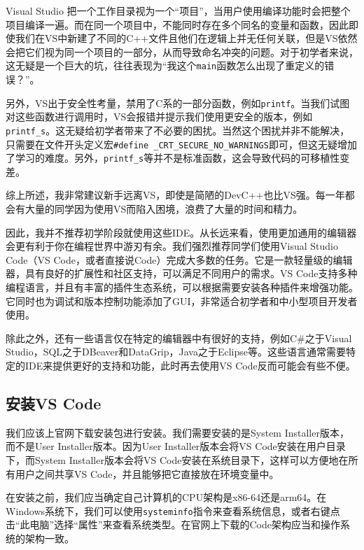 \documentclass[../main.tex]{subfiles}
\begin{document}
\begin{note}
  Visual Studio 把一个工作目录视为一个“项目”，当用户使用编译功能时会把整个项目编译一遍。而在同一个项目中，不能同时存在多个同名的变量和函数，因此即使我们在VS中新建了不同的C++文件且他们在逻辑上并无任何关联，但是VS依然会把它们视为同一个项目的一部分，从而导致命名冲突的问题。对于初学者来说，这无疑是一个巨大的坑，往往表现为“我这个\texttt{main}函数怎么出现了重定义的错误？”。

  另外，VS出于安全性考量，禁用了C系的一部分函数，例如\texttt{printf}。当我们试图对这些函数进行调用时，VS会报错并提示我们使用更安全的版本，例如\texttt{printf\_s}。这无疑给初学者带来了不必要的困扰。当然这个困扰并非不能解决，只需要在文件开头定义宏\texttt{\#define \_CRT\_SECURE\_NO\_WARNINGS}即可，但这无疑增加了学习的难度。另外，\texttt{printf\_s}等并不是标准函数，这会导致代码的可移植性变差。

  综上所述，我非常建议新手远离VS，即使是简陋的DevC++也比VS强。每一年都会有大量的同学因为使用VS而陷入困境，浪费了大量的时间和精力。
\end{note}

因此，我并不推荐初学阶段就使用这些IDE。从长远来看，使用更加通用的编辑器会更有利于你在编程世界中游刃有余。我们强烈推荐同学们使用Visual Studio Code（VS Code，或者直接说Code）完成大多数的任务。它是一款轻量级的编辑器，具有良好的扩展性和社区支持，可以满足不同用户的需求。VS Code支持多种编程语言，并且有丰富的插件生态系统，可以根据需要安装各种插件来增强功能。它同时也为调试和版本控制功能添加了GUI，非常适合初学者和中小型项目开发者使用。

除此之外，还有一些语言仅在特定的编辑器中有很好的支持，例如C\#之于Visual Studio，SQL之于DBeaver和DataGrip，Java之于Eclipse等。这些语言通常需要特定的IDE来提供更好的支持和功能，此时再去使用VS Code反而可能会有些不便。

\subsection{安装VS Code}

我们应该上官网下载安装包进行安装。我们需要安装的是System Installer版本，而不是User Installer版本。因为User Installer版本会将VS Code安装在用户目录下，而System Installer版本会将VS Code安装在系统目录下，这样可以方便地在所有用户之间共享VS Code，并且能够把它直接放在环境变量中。

在安装之前，我们应当确定自己计算机的CPU架构是x86-64还是arm64。在Windows系统下，我们可以使用\texttt{systeminfo}指令来查看系统信息，或者右键点击“此电脑”选择“属性”来查看系统类型。在官网上下载的Code架构应当和操作系统的架构一致。
\end{document}
